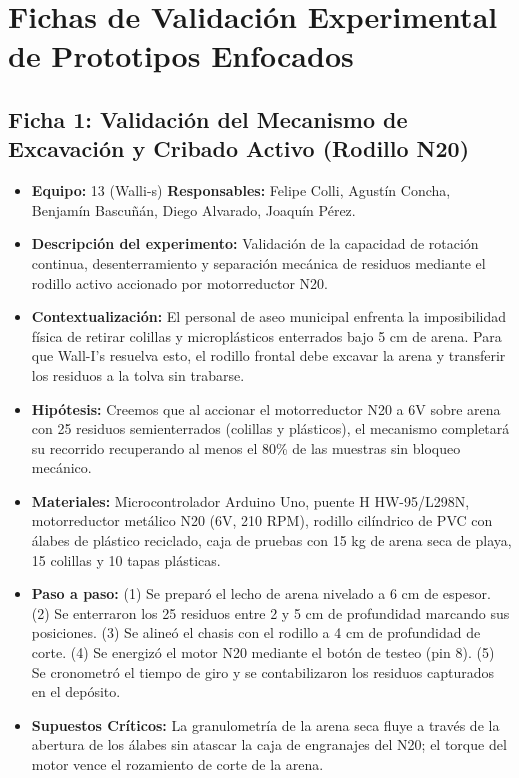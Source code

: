 \documentclass[12pt,letterpaper]{article}
\begin{document}
\section{Fichas de Validación Experimental de Prototipos Enfocados}

\subsection{Ficha 1: Validación del Mecanismo de Excavación y Cribado Activo (Rodillo N20)}
\begin{itemize}[leftmargin=*, noitemsep]
    \item \textbf{Equipo:} 13 (Walli-s) \quad \textbf{Responsables:} Felipe Colli, Agustín Concha, Benjamín Bascuñán, Diego Alvarado, Joaquín Pérez.
    \item \textbf{Descripción del experimento:} Validación de la capacidad de rotación continua, desenterramiento y separación mecánica de residuos mediante el rodillo activo accionado por motorreductor N20.
    \item \textbf{Contextualización:} El personal de aseo municipal enfrenta la imposibilidad física de retirar colillas y microplásticos enterrados bajo 5 cm de arena. Para que Wall-I's resuelva esto, el rodillo frontal debe excavar la arena y transferir los residuos a la tolva sin trabarse.
    \item \textbf{Hipótesis:} Creemos que al accionar el motorreductor N20 a 6V sobre arena con 25 residuos semienterrados (colillas y plásticos), el mecanismo completará su recorrido recuperando al menos el 80\% de las muestras sin bloqueo mecánico.
    \item \textbf{Materiales:} Microcontrolador Arduino Uno, puente H HW-95/L298N, motorreductor metálico N20 (6V, 210 RPM), rodillo cilíndrico de PVC con álabes de plástico reciclado, caja de pruebas con 15 kg de arena seca de playa, 15 colillas y 10 tapas plásticas.
    \item \textbf{Paso a paso:} (1) Se preparó el lecho de arena nivelado a 6 cm de espesor. (2) Se enterraron los 25 residuos entre 2 y 5 cm de profundidad marcando sus posiciones. (3) Se alineó el chasis con el rodillo a 4 cm de profundidad de corte. (4) Se energizó el motor N20 mediante el botón de testeo (pin 8). (5) Se cronometró el tiempo de giro y se contabilizaron los residuos capturados en el depósito.
    \item \textbf{Supuestos Críticos:} La granulometría de la arena seca fluye a través de la abertura de los álabes sin atascar la caja de engranajes del N20; el torque del motor vence el rozamiento de corte de la arena.

\end{itemize}
\end{document}
